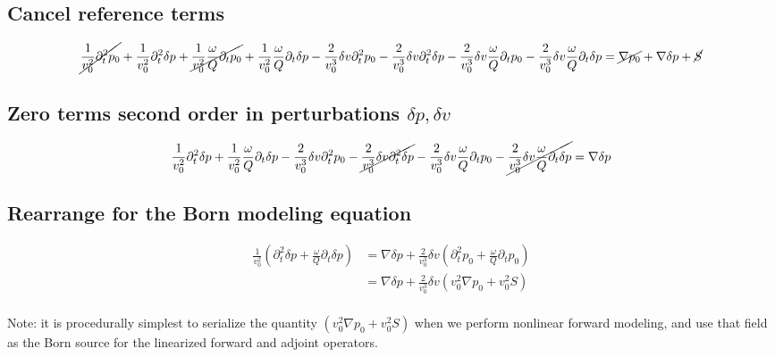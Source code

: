 \documentclass[10pt,fleqn]{article}
\begin{document}
\subsection{Cancel reference terms}
\begin{equation}
	\cancel{ \frac{1}{v_0^2} \partial_t^2 p_0 }
	+ \frac{1}{v_0^2} \partial_t^2 \delta p
	+ \cancel{ \frac{1}{v_0^2} \frac{\omega}{Q} \partial_t p_0 }
	+ \frac{1}{v_0^2} \frac{\omega}{Q} \partial_t \delta p
	- \frac{2}{v_0^3} \delta v \partial_t^2 p_0
	- \frac{2}{v_0^3} \delta v \partial_t^2 \delta p
	- \frac{2}{v_0^3} \delta v \frac{\omega}{Q} \partial_t p_0
	- \frac{2}{v_0^3} \delta v \frac{\omega}{Q} \partial_t \delta p
	= \cancel{ \nabla p_0 } + \nabla \delta p + \cancel{ S }
\end{equation}

\subsection{Zero terms second order in perturbations $\delta p,\delta v$ }
\begin{equation}
	\frac{1}{v_0^2} \partial_t^2 \delta p
	+ \frac{1}{v_0^2} \frac{\omega}{Q} \partial_t \delta p
	- \frac{2}{v_0^3} \delta v \partial_t^2 p_0
	- \cancel{ \frac{2}{v_0^3} \delta v \partial_t^2 \delta p }
	- \frac{2}{v_0^3} \delta v \frac{\omega}{Q} \partial_t p_0
	- \cancel{ \frac{2}{v_0^3} \delta v \frac{\omega}{Q} \partial_t \delta p }
	= \nabla \delta p
\end{equation}

\subsection{Rearrange for the Born modeling equation}
\begin{equation}
	\begin{aligned}
		\frac{1}{v_0^2} \left( \partial_t^2 \delta p + \frac{\omega}{Q} \partial_t \delta p \right)
		 & = \nabla \delta p + \frac{2}{v_0^3} \delta v \left( \partial_t^2 p_0 + \frac{\omega}{Q} \partial_t p_0 \right) \\[10pt]
		 & = \nabla \delta p + \frac{2}{v_0^3} \delta v \left( v_0^2 \nabla p_0 + v_0^2 S \right)                         \\[10pt]
	\end{aligned}
\end{equation}

Note: it is procedurally simplest to serialize the quantity 
$\displaystyle \left( v_0^2 \nabla p_0 + v_0^2 S \right)$ when we perform nonlinear 
forward modeling, and use that field as the Born source for the linearized forward and 
adjoint operators.
\end{document}
